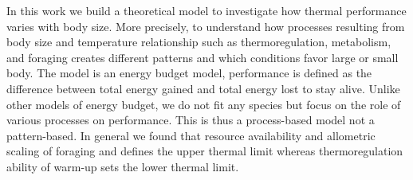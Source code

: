 
 In this work we build a theoretical model to investigate how thermal performance varies with body size.
 More precisely, to understand how processes resulting from body size and temperature relationship such as thermoregulation, metabolism, and foraging creates different patterns and which conditions favor large or small body.
 The model is an energy budget model, performance is defined as the difference between total energy gained and total energy lost to stay alive.
 Unlike other models of energy budget, we do not fit any species but focus on the role of various processes on performance. This is thus a process-based model not a pattern-based.
In general we found that resource availability and allometric scaling of foraging and defines the upper thermal limit whereas thermoregulation ability of warm-up sets the lower thermal limit.
